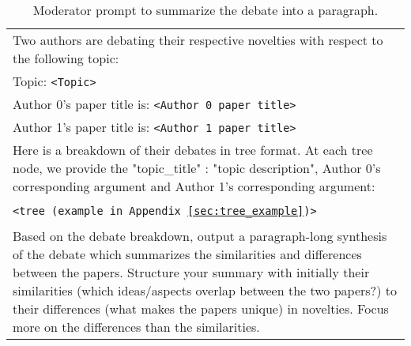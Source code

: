 \begin{table*}[h]
\centering
\begin{tabularx}{\textwidth}{|X|}
\hline
Two authors are debating their respective novelties with respect to the following topic: \\
Topic: \texttt{<Topic>} \\
Author 0's paper title is: \texttt{<Author 0 paper title>} \\
Author 1's paper title is: \texttt{<Author 1 paper title>} \\

Here is a breakdown of their debates in tree format. At each tree node, we provide the "topic\_title" : "topic description", Author 0's corresponding argument and Author 1's corresponding argument:
\\\\
\texttt{<tree (example in Appendix \ref{sec:tree_example})>}
\\\\
Based on the debate breakdown, output a paragraph-long synthesis of the debate which summarizes the similarities and differences between the papers. Structure your summary with initially their similarities (which ideas/aspects overlap between the two papers?) to their differences (what makes the papers unique) in novelties. Focus more on the differences than the similarities.

 \\ \hline
\end{tabularx}
\caption{Moderator prompt to summarize the debate into a paragraph.}
\label{prompt_mod: summarize_debate}
\end{table*}

